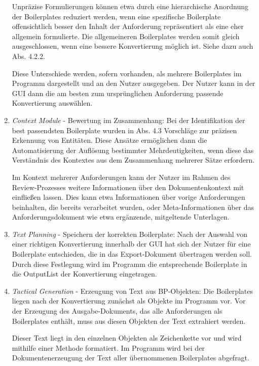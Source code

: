 \documentclass[12pt]{report}
\begin{document}
\begin{enumerate}
Unpräzise Formulierungen können etwa durch eine hierarchische Anordnung der Boilerplates reduziert werden, wenn eine spezifische Boilerplate offensichtlich besser den Inhalt der Anforderung repräsentiert als eine eher allgemein formulierte. Die allgemeineren Boilerplates werden somit gleich ausgeschlossen, wenn eine bessere Konvertierung möglich ist. Siehe dazu auch Abs. 4.2.2.

Diese Unterschiede werden, sofern vorhanden, als mehrere Boilerplates im Programm dargestellt und an den Nutzer ausgegeben. Der Nutzer kann in der GUI dann die am besten zum ursprünglichen Anforderung passende Konvertierung auswählen.

\item \textit{Context Module} - Bewertung im Zusammenhang: Bei der Identifikation der best passendsten Boilerplate wurden in Abs. 4.3 Vorschläge zur präzisen Erkennung von Entitäten. Diese Ansätze ermöglichen dann die Automatisierung der Auflösung bestimmter Mehrdeutigkeiten, wenn diese das Verständnis des Kontextes aus dem Zusammenhang mehrerer Sätze erfordern. 

Im Kontext mehrerer Anforderungen kann der Nutzer im Rahmen des Review-Prozesses weitere Informationen über den Dokumentenkontext mit einfließen lassen. Dies kann etwa Informationen über vorige Anforderungen beinhalten, die bereits verarbeitet wurden, oder Meta-Informationen über das Anforderungsdokument wie etwa ergänzende, mitgeltende Unterlagen.

\item \textit{Text Planning} - Speichern der korrekten Boilerplate: Nach der Auswahl von einer richtigen Konvertierung innerhalb der GUI hat sich der Nutzer für eine Boilerplate entschieden, die in das Export-Dokument übertragen werden soll. Durch diese Festlegung wird im Programm die entsprechende Boilerplate in die OutputList der Konvertierung eingetragen.

\item \textit{Tactical Generation} - Erzeugung von Text aus BP-Objekten: Die Boilerplates liegen nach der Konvertierung zunächst als Objekte im Programm vor. Vor der Erzeugung des Ausgabe-Dokuments, das alle Anforderungen als Boilerplates enthält, muss aus diesen Objekten der Text extrahiert werden. 

Dieser Text liegt in den einzelnen Objekten als Zeichenkette vor und wird mithilfe einer Methode formatiert. Im Programm wird bei der Dokumentenerzeugung der Text aller übernommenen Boilerplates abgefragt.


\end{enumerate}
\end{document}
